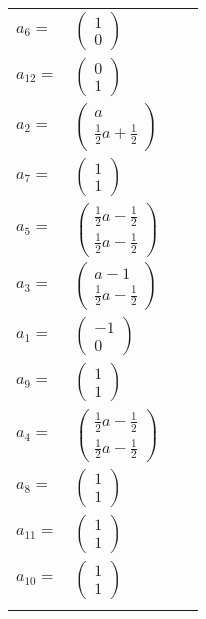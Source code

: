 \documentclass[1p]{elsarticle_modified}
\theoremstyle{definition}
\begin{document}
\begin{tabular}{m{7pt} m{180pt} m{7pt} m{180pt} }
\flushright $a_{6}=$&$\begin{pmatrix}1\\0\end{pmatrix}$ \\
\flushright $a_{12}=$&$\begin{pmatrix}0\\1\end{pmatrix}$ \\
\flushright $a_{2}=$&$\begin{pmatrix}a\\\frac{1}{2} a+\frac{1}{2}\end{pmatrix}$ \\
\flushright $a_{7}=$&$\begin{pmatrix}1\\1\end{pmatrix}$ \\
\flushright $a_{5}=$&$\begin{pmatrix}\frac{1}{2} a-\frac{1}{2}\\\frac{1}{2} a-\frac{1}{2}\end{pmatrix}$ \\
\flushright $a_{3}=$&$\begin{pmatrix}a-1\\\frac{1}{2} a-\frac{1}{2}\end{pmatrix}$ \\
\flushright $a_{1}=$&$\begin{pmatrix}-1\\0\end{pmatrix}$ \\
\flushright $a_{9}=$&$\begin{pmatrix}1\\1\end{pmatrix}$ \\
\flushright $a_{4}=$&$\begin{pmatrix}\frac{1}{2} a-\frac{1}{2}\\\frac{1}{2} a-\frac{1}{2}\end{pmatrix}$ \\
\flushright $a_{8}=$&$\begin{pmatrix}1\\1\end{pmatrix}$ \\
\flushright $a_{11}=$&$\begin{pmatrix}1\\1\end{pmatrix}$ \\
\flushright $a_{10}=$&$\begin{pmatrix}1\\1\end{pmatrix}$\\&\end{tabular}
\end{document}
